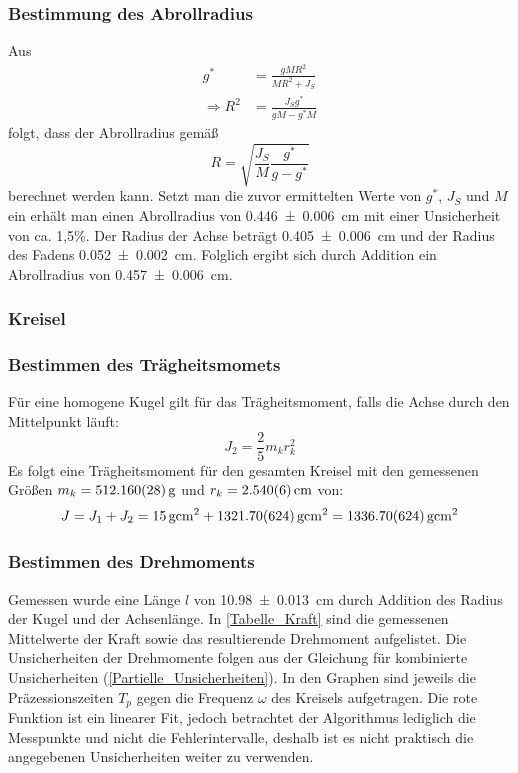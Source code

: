 \documentclass[
	a4paper,
	12pt,
	pagesize,
	ngerman
]{scrartcl}
\begin{document}
	\subsubsection*{Bestimmung des Abrollradius}
	Aus
	\begin{align}
		g^* &= \frac{gMR^2}{MR^2+J_S} \\
		\Rightarrow R^2 &= \frac{J_Sg^*}{gM-g^*M}
	\end{align}
	folgt, dass der Abrollradius gemäß 
	\begin{equation}
		R = \sqrt{\frac{J_S}{M}\frac{g^*}{g-g^*}}
	\end{equation}
	berechnet werden kann. 
	Setzt man die zuvor ermittelten Werte von $g^*$, $J_S$ und $M$ ein erhält man einen Abrollradius von \SI{0,446 \pm 0,006}{cm} mit einer Unsicherheit von ca. 1,5\%. %
	Der Radius der Achse beträgt \SI{0,405 \pm 0,006}{cm} und der Radius des Fadens \SI{0,052\pm 0,002}{cm}. 
	Folglich ergibt sich durch Addition ein Abrollradius von \SI{0,457 \pm 0,006}{cm}.

	\subsubsection{Kreisel}
	\subsubsection*{Bestimmen des Trägheitsmomets}
	Für eine homogene Kugel gilt für das Trägheitsmoment, falls die Achse durch den Mittelpunkt läuft:
	\begin{equation}
		\label{KugelTraegheitsmoment}
		J_2=\frac{2}{5}m_kr_k^2
	\end{equation}
	Es folgt eine Trägheitsmoment für den gesamten Kreisel mit den gemessenen Größen $m_k = \SI{512,16\pm 0,028}{g}$ und $r_k = \SI{2,54\pm 0,006}{cm}$ von:
	\begin{equation}
		J = J_1 + J_2 = \SI{15}{g cm^2} + \SI{1321,70\pm 6,24}{g cm^2} = \SI{1336,70 \pm 6,24}{g cm^2}
		\label{GesamtTraeg}
	\end{equation}
	\subsubsection*{Bestimmen des Drehmoments}
	Gemessen wurde eine Länge $l$ von \SI{10,98 \pm 0,013}{cm} durch Addition des Radius der Kugel und der Achsenlänge. 
	In \cref{Tabelle_Kraft} sind die gemessenen Mittelwerte der Kraft sowie das resultierende Drehmoment aufgelistet. 
	Die Unsicherheiten der Drehmomente folgen aus der Gleichung für kombinierte Unsicherheiten (\cref{Partielle_Unsicherheiten}). %
	In den Graphen  sind jeweils die Präzessionszeiten $T_p$ gegen die Frequenz $\omega$ des Kreisels aufgetragen. Die rote Funktion ist ein linearer Fit, jedoch betrachtet der Algorithmus lediglich die Messpunkte und nicht die Fehlerintervalle, deshalb ist es nicht praktisch die angegebenen Unsicherheiten weiter zu verwenden. 
\end{document}
